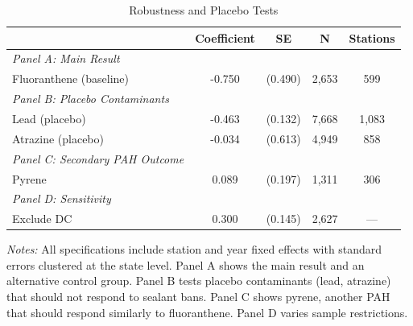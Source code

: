 \begin{table}[htbp]
\centering
\caption{Robustness and Placebo Tests}
\label{tab:robustness}
\begin{tabular}{lcccc}
\toprule
 & Coefficient & SE & N & Stations \\
\midrule
\textit{Panel A: Main Result} & & & & \\
\quad Fluoranthene (baseline) & -0.750 & (0.490) & 2,653 & 599 \\
\midrule
\textit{Panel B: Placebo Contaminants} & & & & \\
\quad Lead (placebo) & -0.463 & (0.132) & 7,668 & 1,083 \\
\quad Atrazine (placebo) & -0.034 & (0.613) & 4,949 & 858 \\
\midrule
\textit{Panel C: Secondary PAH Outcome} & & & & \\
\quad Pyrene & 0.089 & (0.197) & 1,311 & 306 \\
\midrule
\textit{Panel D: Sensitivity} & & & & \\
\quad Exclude DC & 0.300 & (0.145) & 2,627 & --- \\
\bottomrule
\end{tabular}
\begin{tablenotes}
\item \textit{Notes:} All specifications include station and year fixed effects with standard errors 
clustered at the state level. Panel A shows the main result and an alternative control group. 
Panel B tests placebo contaminants (lead, atrazine) that should not respond to sealant bans. 
Panel C shows pyrene, another PAH that should respond similarly to fluoranthene. 
Panel D varies sample restrictions.
\end{tablenotes}
\end{table}
